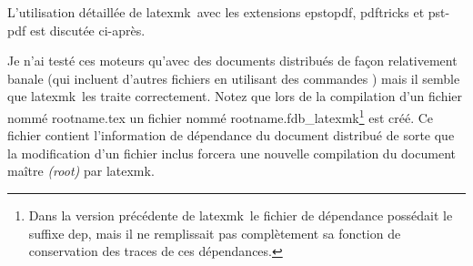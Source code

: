 \documentclass[11pt,french]{article}
\newcommand{\latexmk}{\textsf{latexmk}}
\newcommand{\cmd}[1]{\textsf{#1}}
\begin{document}
L'utilisation détaillée de \latexmk\ avec les extensions \cmd{epstopdf}, \cmd{pdftricks} et \cmd{pst-pdf} est discutée ci-après.

Je n'ai testé ces moteurs qu'avec des documents distribués de façon relativement banale (qui incluent d'autres fichiers en utilisant des commandes \verb||) mais il semble que \latexmk\ les traite correctement. Notez que lors de la compilation d'un fichier nommé \cmd{rootname.tex} un fichier nommé \cmd{rootname.fdb\_latexmk}\footnote{Dans la version précédente de \latexmk\ le fichier de dépendance possédait le suffixe \cmd{dep}, mais il ne remplissait pas complètement sa fonction de conservation des traces de ces dépendances.} est créé. Ce fichier contient l'information de dépendance du document distribué de sorte que la modification d'un fichier inclus forcera une nouvelle compilation du document maître \emph{(root)} par \latexmk.

\end{document}
